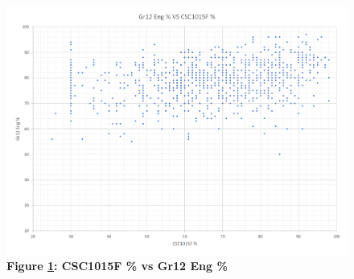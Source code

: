 \begin{figure}[H]
    \centering
    \includegraphics[scale=0.62]{./resources/figures/gr12eng.png}
    \caption[CSC1015F \% vs Gr12 Eng \%]{\textbf{Figure \ref{fig-correlation-gr12eng}: CSC1015F \% vs Gr12 Eng \%}}
    \label{fig-correlation-gr12eng}
\end{figure}